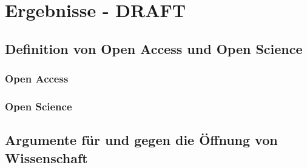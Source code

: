 \chapter{Ergebnisse - DRAFT}

\section{Definition von Open Access und Open Science}
\subsection{Open Access}
\subsection{Open Science}

\section{Argumente für und gegen die Öffnung von Wissenschaft}
